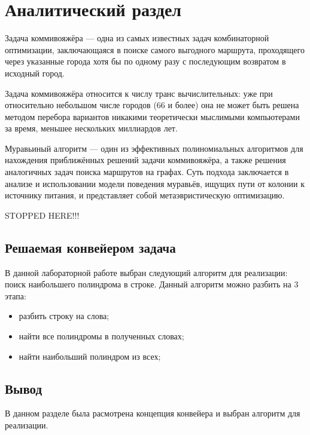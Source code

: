 \chapter{Аналитический раздел}
Задача коммивояжёра — одна из самых известных задач комбинаторной оптимизации, заключающаяся в поиске самого выгодного маршрута, проходящего через указанные города хотя бы по одному разу с последующим возвратом в исходный город.

Задача коммивояжёра относится к числу транс вычислительных: уже при относительно небольшом числе городов (66 и более) она не может быть решена методом перебора вариантов никакими теоретически мыслимыми компьютерами за время, меньшее нескольких миллиардов лет.

Муравьиный алгоритм — один из эффективных полиномиальных алгоритмов для нахождения приближённых решений задачи коммивояжёра, а также решения аналогичных задач поиска маршрутов на графах. Суть подхода заключается в анализе и использовании модели поведения муравьёв, ищущих пути от колонии к источнику питания, и представляет собой метаэвристическую оптимизацию.

STOPPED HERE!!!

\section{Решаемая конвейером задача}
В данной лабораторной работе выбран следующий алгоритм для реализации: поиск наибольшего полиндрома в строке. Данный алгоритм можно разбить на 3 этапа:

\begin{itemize}
	\item разбить строку на слова;
	\item найти все полиндромы в полученных словах;
	\item найти наибольший полиндром из всех;
\end{itemize}


\section{Вывод}

В данном разделе была расмотрена концепция конвейера и выбран алгоритм для реализации.